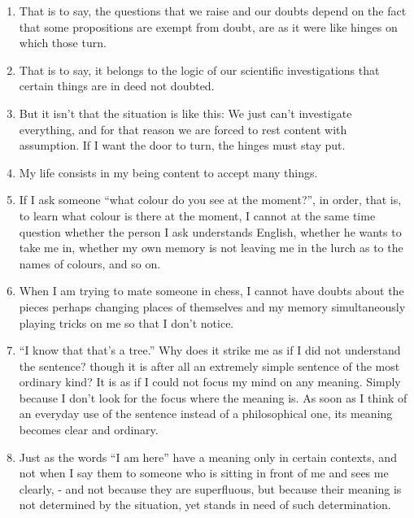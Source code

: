 \documentclass{book}
\begin{document}
\begin{enumerate}
\item
That is to say, the questions that we raise and our doubts depend on the fact
that some propositions are exempt from doubt, are as it were like hinges on
which those turn.

\item
That is to say, it belongs to the logic of our scientific investigations that
certain things are in deed not doubted.

\item
But it isn't that the situation is like this: We just can't investigate
everything, and for that reason we are forced to rest content with assumption.
If I want the door to turn, the hinges must stay put.

\item
My life consists in my being content to accept many things.

\item
If I ask someone ``what colour do you see at the moment?'', in order, that is,
to learn what colour is there at the moment, I cannot at the same time question
whether the person I ask understands English, whether he wants to take me in,
whether my own memory is not leaving me in the lurch as to the names of
colours, and so on.

\item
When I am trying to mate someone in chess, I cannot have doubts about the
pieces perhaps changing places of themselves and my memory simultaneously
playing tricks on me so that I don't notice.

\item
``I know that that's a tree.'' Why does it strike me as if I did not understand
the sentence? though it is after all an extremely simple sentence of the most
ordinary kind? It is as if I could not focus my mind on any meaning. Simply
because I don't look for the focus where the meaning is. As soon as I think of
an everyday use of the sentence instead of a philosophical one, its meaning
becomes clear and ordinary.

\item
Just as the words ``I am here'' have a meaning only in certain contexts, and
not when I say them to someone who is sitting in front of me and sees me
clearly, - and not because they are superfluous, but because their meaning is
not determined by the situation, yet stands in need of such determination.


\end{enumerate}
\end{document}
